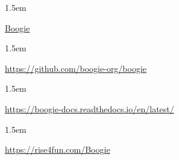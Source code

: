 \documentclass[12pt,twoside]{article}
\begin{document}
\begin{mddefinitions}%


\begin{mdbmarginx}{}{}{}{1.5em}%
\begin{mddefdata}%
\href{https://www.microsoft.com/en-us/research/project/boogie-an-intermediate-verification-language}{Boogie}
\end{mddefdata}%
\end{mdbmarginx}%


\begin{mdbmarginx}{}{}{}{1.5em}%
\begin{mddefdata}%
\href{https://github.com/boogie-org/boogie}{{\ttfamily https://\hspace{0pt}github.\hspace{0pt}com/\hspace{0pt}boogie-\hspace{0pt}org/\hspace{0pt}boogie}}
\end{mddefdata}%
\end{mdbmarginx}%


\begin{mdbmarginx}{}{}{}{1.5em}%
\begin{mddefdata}%
\href{https://boogie-docs.readthedocs.io/en/latest/}{{\ttfamily https://\hspace{0pt}boogie-\hspace{0pt}docs.\hspace{0pt}readthedocs.\hspace{0pt}io/\hspace{0pt}en/\hspace{0pt}latest/\hspace{0pt}}}
\end{mddefdata}%
\end{mdbmarginx}%


\begin{mdbmarginx}{}{}{}{1.5em}%
\begin{mddefdata}%
\href{https://rise4fun.com/Boogie}{{\ttfamily https://\hspace{0pt}rise4fun.\hspace{0pt}com/\hspace{0pt}Boogie}}%
\end{mddefdata}%
\end{mdbmarginx}%
\end{mddefinitions}%
\end{document}
